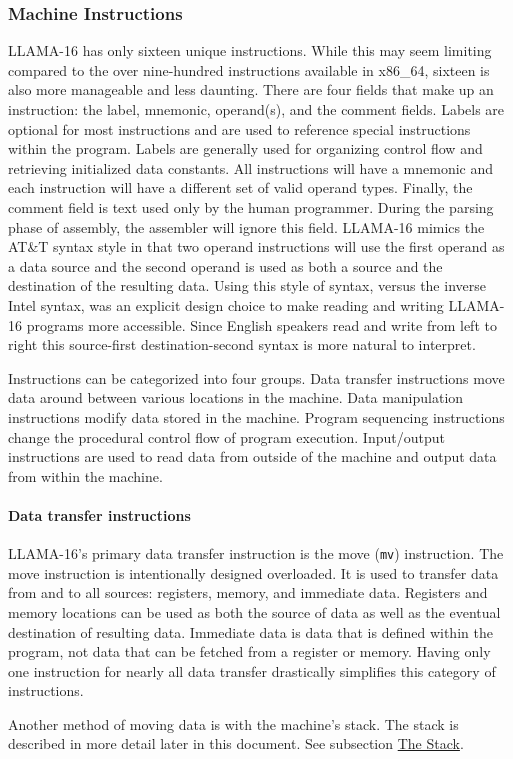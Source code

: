 \documentclass[man,hidelinks,floatsintext]{apa7}
\begin{document}
\subsubsection{Machine Instructions}
\label{sec:machineinstr}
LLAMA-16 has only sixteen unique instructions. While this may seem limiting compared to the over nine-hundred instructions available in x86\_64, sixteen is also more manageable and less daunting. There are four fields that make up an instruction: the label, mnemonic, operand(s), and the comment fields. Labels are optional for most instructions and are used to reference special instructions within the program. Labels are generally used for organizing control flow and retrieving initialized data constants. All instructions will have a mnemonic and each instruction will have a different set of valid operand types. Finally, the comment field is text used only by the human programmer. During the parsing phase of assembly, the assembler will ignore this field. LLAMA-16 mimics the AT\&T syntax style in that two operand instructions will use the first operand as a data source and the second operand is used as both a source and the destination of the resulting data. Using this style of syntax, versus the inverse Intel syntax, was an explicit design choice to make reading and writing LLAMA-16 programs more accessible. Since English speakers read and write from left to right this source-first destination-second syntax is more natural to interpret.\par
Instructions can be categorized into four groups. Data transfer instructions move data around between various locations in the machine. Data manipulation instructions modify data stored in the machine. Program sequencing instructions change the procedural control flow of program execution. Input/output instructions are used to read data from outside of the machine and output data from within the machine.
\paragraph{Data transfer instructions}
LLAMA-16's primary data transfer instruction is the move (\verb|mv|) instruction. The move instruction is intentionally designed overloaded. It is used to transfer data from and to all sources: registers, memory, and immediate data. Registers and memory locations can be used as both the source of data as well as the eventual destination of resulting data. Immediate data is data that is defined within the program, not data that can be fetched from a register or memory. Having only one instruction for nearly all data transfer drastically simplifies this category of instructions.\par
Another method of moving data is with the machine's stack. The stack is described in more detail later in this document. See subsection \hyperref[sec:stack]{The Stack}.
\end{document}
